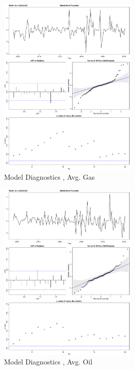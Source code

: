 \documentclass[a4paper]{article}
\begin{document}
\begin{enumerate}
	\begin{figure}
	\centering
	\includegraphics[width=0.6\textwidth]{Sarima_Gas_Final}
	\caption{Model Diagnostics , Avg. Gas}
	\label{fig1:Sarima_Gas_Final}
\end{figure}

	\begin{figure}
	\centering
	\includegraphics[width=0.6\textwidth]{Sarima_Oil_Final}
	\caption{Model Diagnostics , Avg. Oil}
	\label{fig1:Sarima_Oil_Final}
\end{figure}


\end{enumerate}
\end{document}
